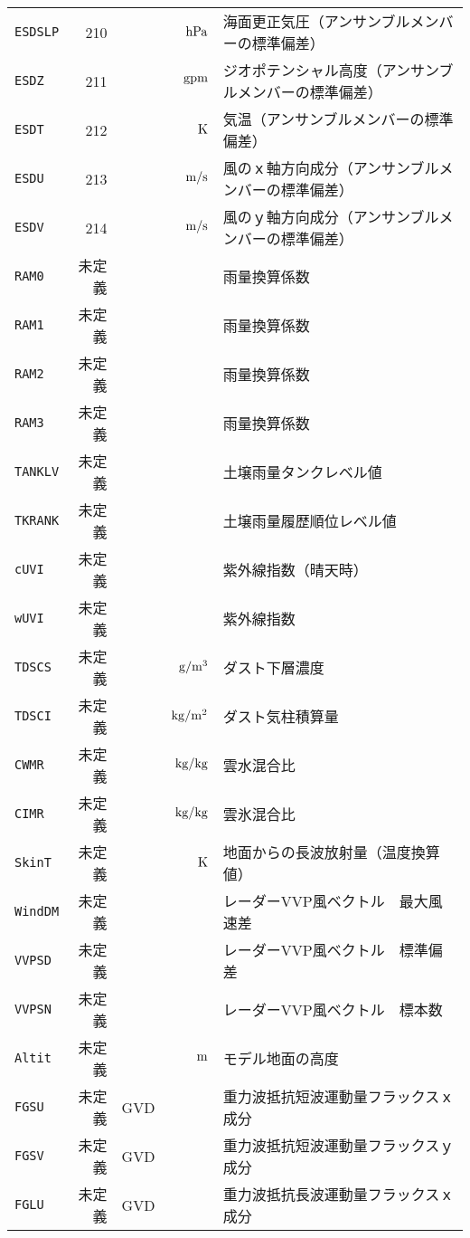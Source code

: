 \begin{longtable}{l|rrrp{}}
{\tt ESDSLP} & 210 &  & ${\rm\,hPa}$ & 海面更正気圧（アンサンブルメンバーの標準偏差） \\
{\tt ESDZ} & 211 &  & ${\rm\,gpm}$ & ジオポテンシャル高度（アンサンブルメンバーの標準偏差） \\
{\tt ESDT} & 212 &  & ${\rm\,K}$ & 気温（アンサンブルメンバーの標準偏差） \\
{\tt ESDU} & 213 &  & ${\rm\,m/s}$ & 風のｘ軸方向成分（アンサンブルメンバーの標準偏差） \\
{\tt ESDV} & 214 &  & ${\rm\,m/s}$ & 風のｙ軸方向成分（アンサンブルメンバーの標準偏差） \\
{\tt RAM0} & 未定義 &  &  & 雨量換算係数 \\
{\tt RAM1} & 未定義 &  &  & 雨量換算係数 \\
{\tt RAM2} & 未定義 &  &  & 雨量換算係数 \\
{\tt RAM3} & 未定義 &  &  & 雨量換算係数 \\
{\tt TANKLV} & 未定義 &  &  & 土壌雨量タンクレベル値 \\
{\tt TKRANK} & 未定義 &  &  & 土壌雨量履歴順位レベル値 \\
{\tt cUVI} & 未定義 &  &  & 紫外線指数（晴天時） \\
{\tt wUVI} & 未定義 &  &  & 紫外線指数 \\
{\tt TDSCS} & 未定義 &  & ${\rm\,g/m^3}$ & ダスト下層濃度 \\
{\tt TDSCI} & 未定義 &  & ${\rm\,kg/m^2}$ & ダスト気柱積算量 \\
{\tt CWMR} & 未定義 &  & ${\rm\,kg/kg}$ & 雲水混合比 \\
{\tt CIMR} & 未定義 &  & ${\rm\,kg/kg}$ & 雲氷混合比 \\
{\tt SkinT} & 未定義 &  & ${\rm\,K}$ & 地面からの長波放射量（温度換算値） \\
{\tt WindDM} & 未定義 &  &  & レーダーVVP風ベクトル　最大風速差 \\
{\tt VVPSD} & 未定義 &  &  & レーダーVVP風ベクトル　標準偏差 \\
{\tt VVPSN} & 未定義 &  &  & レーダーVVP風ベクトル　標本数 \\
{\tt Altit} & 未定義 &  & ${\rm\,m}$ & モデル地面の高度 \\
{\tt FGSU} & 未定義 & GVD &  & 重力波抵抗短波運動量フラックスｘ成分 \\
{\tt FGSV} & 未定義 & GVD &  & 重力波抵抗短波運動量フラックスｙ成分 \\
{\tt FGLU} & 未定義 & GVD &  & 重力波抵抗長波運動量フラックスｘ成分 \\

\end{longtable}
